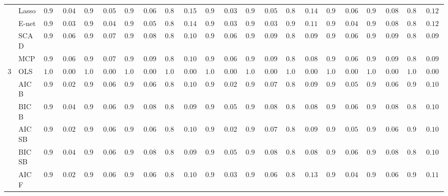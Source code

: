 \begin{tabular}{p{0.2cm}p{1cm}|p{0.6cm}p{0.6cm}|p{0.6cm}p{0.6cm}p{0.6cm}p{0.6cm}p{0.6cm}p{0.6cm}|p{0.6cm}p{0.6cm}p{0.6cm}p{0.6cm}p{0.6cm}p{0.6cm}|p{0.6cm}p{0.6cm}p{0.6cm}p{0.6cm}p{0.6cm}p{0.6cm}}
 & Lasso  & $0.990$ & $0.0438$ & $0.984$ & $0.0545$ & $0.974$ & $0.0676$ & $0.834$ & $0.1506$ & $0.992$ & $0.0394$ & $0.984$ & $0.0545$ & $0.872$ & $0.1408$ & $0.980$ & $0.0603$ & $0.952$ & $0.0858$ & $0.838$ & $0.1229$ \\
 & E-net  & $0.992$ & $0.0394$ & $0.988$ & $0.0477$ & $0.984$ & $0.0545$ & $0.854$ & $0.1417$ & $0.994$ & $0.0343$ & $0.992$ & $0.0394$ & $0.904$ & $0.1154$ & $0.988$ & $0.0477$ & $0.954$ & $0.0846$ & $0.844$ & $0.1225$ \\
 & SCAD  & $0.976$ & $0.0653$ & $0.970$ & $0.0718$ & $0.946$ & $0.0892$ & $0.846$ & $0.1019$ & $0.978$ & $0.0629$ & $0.942$ & $0.0912$ & $0.836$ & $0.0916$ & $0.976$ & $0.0653$ & $0.944$ & $0.0903$ & $0.856$ & $0.0903$ \\
 & MCP  & $0.972$ & $0.0697$ & $0.968$ & $0.0737$ & $0.936$ & $0.0938$ & $0.844$ & $0.1085$ & $0.976$ & $0.0653$ & $0.938$ & $0.0930$ & $0.832$ & $0.0886$ & $0.972$ & $0.0697$ & $0.942$ & $0.0912$ & $0.850$ & $0.0916$ \\\hline
3 & OLS  & $1.000$ & $0.0000$ & $1.000$ & $0.0000$ & $1.000$ & $0.0000$ & $1.000$ & $0.0000$ & $1.000$ & $0.0000$ & $1.000$ & $0.0000$ & $1.000$ & $0.0000$ & $1.000$ & $0.0000$ & $1.000$ & $0.0000$ & $1.000$ & $0.0000$ \\
 & AIC B  & $0.998$ & $0.0200$ & $0.980$ & $0.0603$ & $0.978$ & $0.0629$ & $0.898$ & $0.1005$ & $0.996$ & $0.0281$ & $0.970$ & $0.0718$ & $0.866$ & $0.0945$ & $0.986$ & $0.0513$ & $0.978$ & $0.0629$ & $0.910$ & $0.1040$ \\
 & BIC B  & $0.990$ & $0.0438$ & $0.972$ & $0.0697$ & $0.960$ & $0.0804$ & $0.860$ & $0.0921$ & $0.986$ & $0.0513$ & $0.948$ & $0.0882$ & $0.842$ & $0.0867$ & $0.978$ & $0.0629$ & $0.952$ & $0.0858$ & $0.872$ & $0.1006$ \\
 & AIC SB  & $0.998$ & $0.0200$ & $0.980$ & $0.0603$ & $0.978$ & $0.0629$ & $0.898$ & $0.1005$ & $0.996$ & $0.0281$ & $0.970$ & $0.0718$ & $0.868$ & $0.0952$ & $0.986$ & $0.0513$ & $0.978$ & $0.0629$ & $0.910$ & $0.1040$ \\
 & BIC SB  & $0.990$ & $0.0438$ & $0.972$ & $0.0697$ & $0.960$ & $0.0804$ & $0.860$ & $0.0921$ & $0.986$ & $0.0513$ & $0.950$ & $0.0870$ & $0.842$ & $0.0867$ & $0.978$ & $0.0629$ & $0.952$ & $0.0858$ & $0.872$ & $0.1006$ \\
 & AIC F  & $0.998$ & $0.0200$ & $0.980$ & $0.0603$ & $0.978$ & $0.0629$ & $0.898$ & $0.1005$ & $0.994$ & $0.0343$ & $0.972$ & $0.0697$ & $0.858$ & $0.1342$ & $0.988$ & $0.0477$ & $0.974$ & $0.0676$ & $0.902$ & $0.1155$ \\

\end{tabular}
